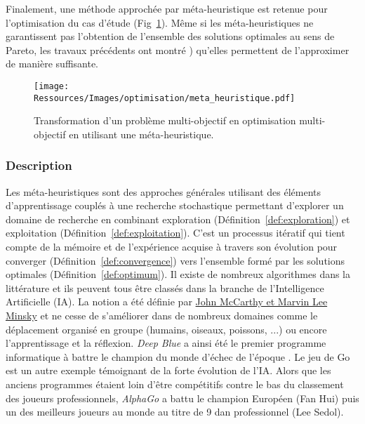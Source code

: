 Finalement, une méthode approchée par méta-heuristique est retenue pour l’optimisation du
cas d’étude (Fig~\ref{fig:multi_meta}). Même si les méta-heuristiques ne garantissent pas
l’obtention de l’ensemble des solutions optimales au sens de Pareto, les travaux
précédents ont montré \parencite{Rivallain2013,Recht2016}) qu’elles permettent de
l’approximer de manière suffisante.

\begin{figure}
    \begin{center}
        \texttt{[image: Ressources/Images/optimisation/meta\_heuristique.pdf]}
    \end{center}
    \caption{Transformation d’un problème multi-objectif en optimisation
             multi-objectif en utilisant une méta-heuristique.
             \label{fig:multi_meta}}
\end{figure}

\subsubsection{Description} %
\label{ssub:description_meta}
Les méta-heuristiques sont des approches générales utilisant des éléments d’apprentissage
couplés à une recherche stochastique permettant d’explorer un domaine de recherche en
combinant exploration (Définition~\ref{def:exploration}) et exploitation
(Définition~\ref{def:exploitation}). C’est un processus itératif qui tient compte de la
mémoire et de l’expérience acquise à travers son évolution pour converger
(Définition~\ref{def:convergence}) vers l’ensemble formé par les solutions optimales
(Définition~\ref{def:optimum}). Il existe de nombreux algorithmes dans la littérature et
ils peuvent tous être classés dans la branche de l’Intelligence Artificielle (IA). La
notion a été définie par
\href{http://www-formal.stanford.edu/jmc/whatisai/whatisai.html}{John McCarthy
et Marvin Lee Minsky} et ne cesse de s’améliorer dans de nombreux domaines comme le
déplacement organisé en groupe (humains, oiseaux, poissons, ...) ou encore l’apprentissage
et la réflexion. \textit{Deep Blue} a ainsi été le premier programme informatique à battre
le champion du monde d’échec de l’époque \parencite{Hsu199970}. Le jeu de Go est un autre
exemple témoignant de la forte évolution de l’IA. Alors que les anciens programmes étaient
loin d’être compétitifs contre le bas du classement des joueurs professionnels,
\textit{AlphaGo} \parencite{Silver2016484} a battu le champion Européen (Fan Hui) puis un
des meilleurs joueurs au monde au titre de 9 dan professionnel (Lee Sedol).

